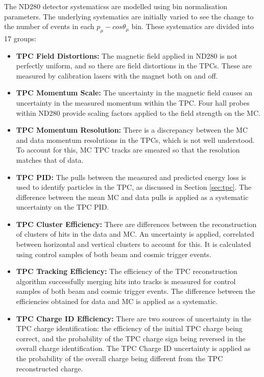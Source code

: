 The ND280 detector systematicss are modelled using bin normalisation parameters. The underlying systematics are initially varied to see the change to the number of events in each $p_{\mu} - cos \theta_{\mu}$ bin. These systematics are divided into 17 groups:

\begin{itemize}

\item \textbf{TPC Field Distortions:} The magnetic field applied in ND280 is not perfectly uniform, and so there are field distortions in the TPCs. These are measured by calibration lasers with the magnet both on and off.

\item \textbf{TPC Momentum Scale:} The uncertainty in the magnetic field causes an uncertainty in the measured momentum within the TPC. Four hall probes within ND280 provide scaling factors applied to the field strength on the MC.

\item \textbf{TPC Momentum Resolution:} There is a discrepancy between the MC and data momentum resolutions in the TPCs, which is not well understood. To account for this, MC TPC tracks are smeared so that the resolution matches that of data. 

\item \textbf{TPC PID:} The pulls between the measured and predicted energy loss is used to identify particles in the TPC, as discussed in Section \ref{sec:tpc}. The difference between the mean MC and data pulls is applied as a systematic uncertainty on the TPC PID.

\item \textbf{TPC Cluster Efficiency:} There are differences between the reconstruction of clusters of hits in the data and MC. An uncertainty is applied, correlated between horizontal and vertical clusters to account for this. It is calculated using control samples of both beam and cosmic trigger events.

\item \textbf{TPC Tracking Efficiency:} The efficiency of the TPC reconstruction algorithm successfully merging hits into tracks is measured for control samples of both beam and cosmic trigger events. The difference between the efficiencies obtained for data and MC is applied as a systematic.

\item \textbf{TPC Charge ID Efficiency:} There are two sources of uncertainty in the TPC charge identification: the efficiency of the initial TPC charge being correct, and the probability of the TPC charge sign being reversed in the overall charge identification. The TPC Charge ID uncertainty is applied as the probability of the overall charge being different from the TPC reconstructed charge.


\end{itemize}
